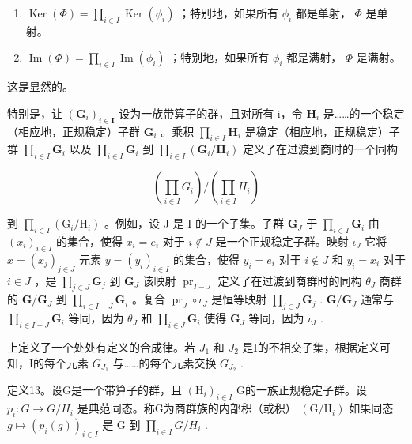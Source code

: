 \begin{enumerate}
\def\labelenumi{(\alph{enumi})}
\item
  \(\operatorname{Ker}(\Phi) = \prod_{i \in I} \operatorname{Ker}(\phi_i)\) ；特别地，如果所有 \(\phi_i\) 都是单射， \(\Phi\) 是单射。
\item
  \(\operatorname{Im}(\Phi) = \prod_{i\in I}\operatorname{Im}(\phi_i)\) ；特别地，如果所有 \(\phi_i\) 都是满射， \(\Phi\) 是满射。
\end{enumerate}

这是显然的。

特别是，让 \((\mathbf{G}_{i})_{i\in\mathbf{I}}\) 设为一族带算子的群，且对所有 i，令 \(\mathbf{H}_i\) 是……的一个稳定（相应地，正规稳定）子群 \(\mathbf{G}_i\) 。乘积 \(\prod_{i\in I}\mathbf{H}_i\) 是稳定（相应地，正规稳定）子群 \(\prod_{i\in I}\mathbf{G}_i\) 以及 \(\prod_{i\in I}\mathbf{G}_i\) 到 \(\prod_{i\in I}(\mathbf{G}_i / \mathbf{H}_i)\) 定义了在过渡到商时的一个同构

\[
\left(\prod_ {i \in I} G _ {i}\right) / \left(\prod_ {i \in I} H _ {i}\right)
\]

到 \(\prod_{i\in I}(\mathrm{G}_i / \mathrm{H}_i)\) 。例如，设 J 是 I 的一个子集。子群 \(\mathbf{G}_{J}\) 于 \(\prod_{i\in I}\mathbf{G}_i\) 由 \((x_{i})_{i\in I}\) 的集合，使得 \(x_{i} = e_{i}\) 对于 \(i\notin J\) 是一个正规稳定子群。映射 \(\iota_{J}\) 它将 \(x = (x_{j})_{j\in J}\) 元素 \(y = (y_{i})_{i\in I}\) 的集合，使得 \(y_{i} = e_{i}\) 对于 \(i\notin J\) 和 \(y_{i} = x_{i}\) 对于 \(i\in J\) ，是 \(\prod_{j\in J}\mathbf{G}_j\) 到 \(\mathbf{G}_{J}\) 该映射 \(\operatorname{pr}_{I - J}\) 定义了在过渡到商群时的同构 \(\theta_J\) 商群的 \(\mathbf{G} / \mathbf{G}_J\) 到 \(\prod_{i\in I - J}\mathbf{G}_i\) 。复合 \(\operatorname{pr}_J\circ \iota_J\) 是恒等映射 \(\prod_{j\in J}\mathbf{G}_j\) . \(\mathbf{G} / \mathbf{G}_J\) 通常与 \(\prod_{i\in I - J}\mathbf{G}_i\) 等同，因为 \(\theta_J\) 和 \(\prod_{i\in J}\mathbf{G}_i\) 使得 \(\mathbf{G}_J\) 等同，因为 \(\iota_J\) .

上定义了一个处处有定义的合成律。若 \(J_{1}\) 和 \(J_{2}\) 是I的不相交子集，根据定义可知，I的每个元素 \(G_{J_{1}}\) 与……的每个元素交换 \(G_{J_{2}}\) .

定义13。设G是一个带算子的群，且 \((\mathrm{H}_{i})_{i\in I}\) G的一族正规稳定子群。设 \(p_{i}\colon G\to G/H_{i}\) 是典范同态。称G为商群族的内部积（或积） \((\mathrm{G}/\mathrm{H}_{i})\) 如果同态 \(g\mapsto(p_{i}(g))_{i\in I}\) 是 G 到 \(\prod_{i\in I}G/H_{i}\) .

